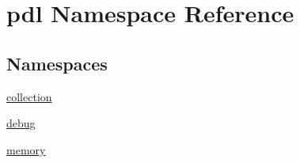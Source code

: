 \hypertarget{namespacepdl}{}\section{pdl Namespace Reference}
\label{namespacepdl}
\subsection*{Namespaces}
\begin{DoxyCompactItemize}
\item 
 \mbox{\hyperlink{namespacepdl_1_1collection}{collection}}
\item 
 \mbox{\hyperlink{namespacepdl_1_1debug}{debug}}
\item 
 \mbox{\hyperlink{namespacepdl_1_1memory}{memory}}
\end{DoxyCompactItemize}
